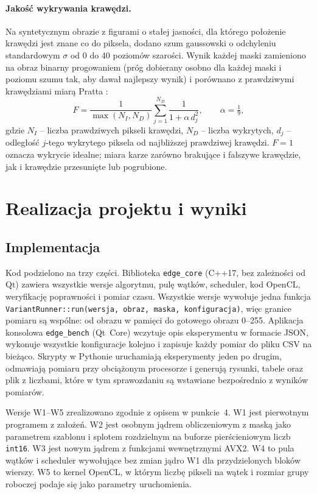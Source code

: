\documentclass[12pt,a4paper]{article}
\newcommand{\kod}[1]{\texttt{#1}}
\begin{document}
\paragraph{Jakość wykrywania krawędzi.} Na syntetycznym obrazie z figurami o stałej jasności, dla którego położenie krawędzi jest znane co do piksela, dodano szum gaussowski o odchyleniu standardowym $\sigma$ od 0 do 40 poziomów szarości. Wynik każdej maski zamieniono na obraz binarny progowaniem (próg dobierany osobno dla każdej maski i poziomu szumu tak, aby dawał najlepszy wynik) i porównano z prawdziwymi krawędziami miarą Pratta \cite{pratt}:
\begin{equation}
	F = \frac{1}{\max(N_I, N_D)} \sum_{j=1}^{N_D} \frac{1}{1 + \alpha\, d_j^{2}}, \qquad \alpha = \tfrac{1}{9},
\end{equation}
gdzie $N_I$ -- liczba prawdziwych pikseli krawędzi, $N_D$ -- liczba wykrytych, $d_j$ -- odległość $j$-tego wykrytego piksela od najbliższej prawdziwej krawędzi. $F = 1$ oznacza wykrycie idealne; miara karze zarówno brakujące i fałszywe krawędzie, jak i krawędzie przesunięte lub pogrubione.

\section{Realizacja projektu i wyniki}

\subsection{Implementacja}
\label{sec:impl}

Kod podzielono na trzy części. Biblioteka \kod{edge\_core} (C++17, bez zależności od Qt) zawiera wszystkie wersje algorytmu, pulę wątków, scheduler, kod OpenCL, weryfikację poprawności i pomiar czasu. Wszystkie wersje wywołuje jedna funkcja \kod{VariantRunner::run(wersja, obraz, maska, konfiguracja)}, więc granice pomiaru są wspólne: od obrazu w pamięci do gotowego obrazu 0--255. Aplikacja konsolowa \kod{edge\_bench} (Qt~Core) wczytuje opis eksperymentu w formacie JSON, wykonuje wszystkie konfiguracje kolejno i zapisuje każdy pomiar do pliku CSV na bieżąco. Skrypty w Pythonie uruchamiają eksperymenty jeden po drugim, odmawiają pomiaru przy obciążonym procesorze i generują rysunki, tabele oraz plik z liczbami, które w tym sprawozdaniu są wstawiane bezpośrednio z wyników pomiarów.

Wersje W1--W5 zrealizowano zgodnie z opisem w punkcie~4. W1 jest pierwotnym programem z założeń. W2 jest osobnym jądrem obliczeniowym z maską jako parametrem szablonu i splotem rozdzielnym na buforze pierścieniowym liczb \kod{int16}. W3 jest nowym jądrem z funkcjami wewnętrznymi AVX2. W4 to pula wątków i scheduler wywołujące bez zmian jądro W1 dla przydzielonych bloków wierszy. W5 to kernel OpenCL, w którym liczbę pikseli na wątek i rozmiar grupy roboczej podaje się jako parametry uruchomienia.
\end{document}
